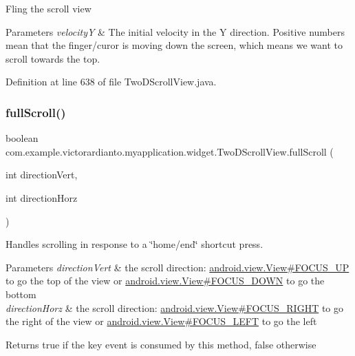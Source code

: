 Fling the scroll view


\begin{DoxyParams}{Parameters}
{\em velocityY} & The initial velocity in the Y direction. Positive numbers mean that the finger/curor is moving down the screen, which means we want to scroll towards the top. \\
\hline
\end{DoxyParams}


Definition at line 638 of file Two\+D\+Scroll\+View.\+java.

\mbox{\label{classcom_1_1example_1_1victorardianto_1_1myapplication_1_1widget_1_1_two_d_scroll_view_ac45fa20d597559082c6f82d1844a1ab4}} 
\subsubsection{\texorpdfstring{full\+Scroll()}{fullScroll()}}
{\footnotesize\ttfamily boolean com.\+example.\+victorardianto.\+myapplication.\+widget.\+Two\+D\+Scroll\+View.\+full\+Scroll (\begin{DoxyParamCaption}\item[{int}]{direction\+Vert,  }\item[{int}]{direction\+Horz }\end{DoxyParamCaption})\hspace{0.3cm}{\ttfamily [inline]}}

Handles scrolling in response to a \char`\"{}home/end\char`\"{} shortcut press.


\begin{DoxyParams}{Parameters}
{\em direction\+Vert} & the scroll direction\+: \mbox{\hyperlink{}{android.\+view.\+View\#\+F\+O\+C\+U\+S\+\_\+\+UP}} to go the top of the view or \mbox{\hyperlink{}{android.\+view.\+View\#\+F\+O\+C\+U\+S\+\_\+\+D\+O\+WN}} to go the bottom \\
\hline
{\em direction\+Horz} & the scroll direction\+: \mbox{\hyperlink{}{android.\+view.\+View\#\+F\+O\+C\+U\+S\+\_\+\+R\+I\+G\+HT}} to go the right of the view or \mbox{\hyperlink{}{android.\+view.\+View\#\+F\+O\+C\+U\+S\+\_\+\+L\+E\+FT}} to go the left \\
\hline
\end{DoxyParams}
\begin{DoxyReturn}{Returns}
true if the key event is consumed by this method, false otherwise 
\end{DoxyReturn}


